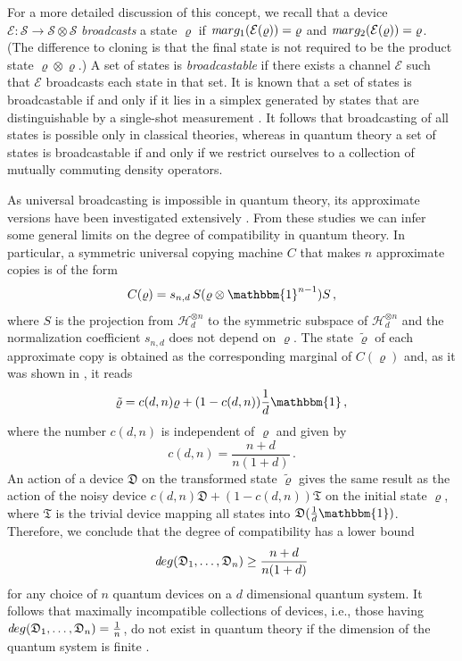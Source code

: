 \documentclass[12pt]{article}
\theoremstyle{definition}
\newcommand{\hi}{\mathcal{H}} %
\newcommand{\id}{\mathbbm{1}} %
\newcommand{\Ec}{\mathcal{E}} %
\newcommand{\Dev}{\mathfrak{D}} %
\newcommand{\Triv}{\mathfrak{T}} %
\def\marg{\textit marg}
\def\deg{\textit deg}
\begin{document}
For a more detailed discussion of this concept, we recall that a device $\Ec:\mathcal{S}\to\mathcal{S}\otimes\mathcal{S}$ \emph{broadcasts} a state $\varrho$ if $\marg_1 (\Ec(\varrho)) = \varrho$ and $\marg_2(\Ec(\varrho)) = \varrho$.
(The difference to cloning is that the final state is not required to be the product state $\varrho\otimes\varrho$.)
A set of states is \emph{broadcastable} if there exists a channel $\Ec$ such that $\Ec$ broadcasts each state in that set.
It is known that a set of states is broadcastable if and only if it lies in a simplex generated by states that are distinguishable by a single-shot measurement \cite{BaBaLeWi07}.
It follows that broadcasting of all states is possible only in classical theories, whereas in quantum theory a set of states is broadcastable if and only if we restrict ourselves to a collection of mutually commuting density operators.

As universal broadcasting is impossible in quantum theory, its approximate versions have been investigated extensively \cite{ScIbGiAc05}.
From these studies we can infer some general limits on the degree of compatibility in quantum theory. 
In particular, a symmetric universal copying machine $C$ that makes $n$ approximate copies is of the form \cite{KeWe99}
\begin{equation}
C(\varrho) = s_{n,d} \, S(\varrho \otimes \id^{n-1}) S\, , 
\end{equation}
where $S$ is the projection from $\hi_d^{\otimes n}$ to the symmetric subspace of $\hi_d^{\otimes n}$ and the normalization coefficient $s_{n,d}$ does not depend on $\varrho$.
The state $\tilde{\varrho}$ of each approximate copy is obtained as the corresponding marginal of $C(\varrho)$ and, as it was shown in \cite{Werner98}, it reads
\begin{equation}
\tilde{\varrho} = c(d,n) \varrho + (1-c(d,n)) \frac{1}{d} \id \, ,
\end{equation}
where the number $c(d,n)$ is independent of $\varrho$ and given by
\begin{equation}
c(d,n) = \frac{n+d}{n(1+d)} \, .
\end{equation} 
An action of a device $\Dev$ on the transformed state $\tilde{\varrho}$ gives the same result as the action of the noisy device $c(d,n) \Dev + (1-c(d,n)) \Triv$ on the initial state $\varrho$, where $\Triv$ is the trivial device mapping all states into $\Dev(\frac{1}{d} \id)$.
Therefore, we conclude that the degree of compatibility has a lower bound
\begin{equation}\label{eq:bc-bound}
\deg(\Dev_1,\ldots,\Dev_n) \geq \frac{n+d}{n(1+d)}
\end{equation}
for any choice of $n$ quantum devices on a $d$ dimensional quantum system.
It follows that maximally incompatible collections of devices, i.e., those having $\deg(\Dev_1,\ldots,\Dev_n) = \frac{1}{n}$, do not exist in quantum theory if the dimension of the quantum system is finite \cite{HeScToZi14}.
\end{document}
